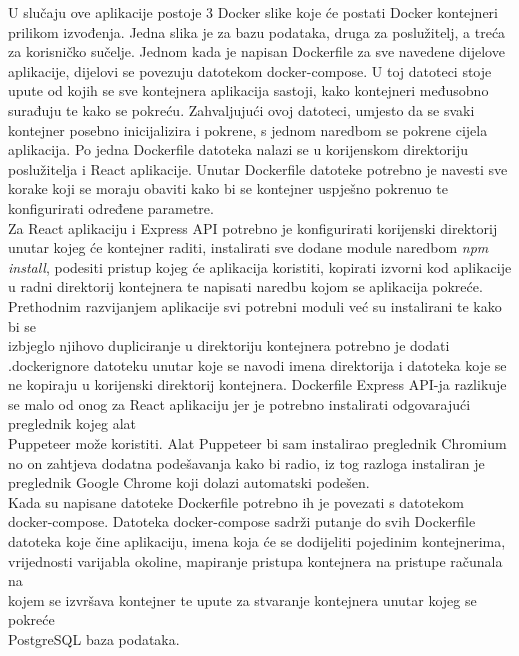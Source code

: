\documentclass[times, utf8, zavrsni]{fer}
\begin{document}
U slučaju ove aplikacije postoje 3 Docker slike koje će postati Docker kontejneri prilikom izvođenja. Jedna slika je za bazu podataka,
druga za poslužitelj, a treća za korisničko sučelje. Jednom kada je napisan Dockerfile za sve navedene dijelove aplikacije, dijelovi se povezuju  
datotekom docker-compose. U toj datoteci stoje upute od kojih se sve kontejnera aplikacija sastoji, kako kontejneri međusobno surađuju te kako se pokreću. Zahvaljujući 
ovoj datoteci, umjesto da se svaki kontejner posebno inicijalizira i pokrene, s jednom naredbom se pokrene cijela aplikacija.
Po jedna Dockerfile datoteka nalazi se u korijenskom direktoriju poslužitelja i 
React aplikacije. Unutar Dockerfile datoteke potrebno je navesti sve korake koji se moraju obaviti kako bi se kontejner uspješno pokrenuo te konfigurirati
određene parametre.
\\Za React aplikaciju i Express API potrebno je konfigurirati korijenski direktorij unutar kojeg će kontejner raditi, instalirati sve dodane module naredbom \emph{npm install}, 
podesiti pristup  kojeg će aplikacija koristiti, kopirati izvorni kod aplikacije u radni direktorij kontejnera te napisati naredbu kojom se 
aplikacija pokreće. \\Prethodnim razvijanjem aplikacije svi potrebni moduli već su instalirani te kako bi se\\izbjeglo njihovo dupliciranje u direktoriju kontejnera potrebno je dodati 
.dockerignore datoteku unutar koje se navodi imena direktorija i datoteka koje se ne kopiraju u korijenski direktorij kontejnera.
Dockerfile Express API-ja razlikuje se malo od onog za React aplikaciju jer je potrebno instalirati odgovarajući preglednik kojeg alat \\Puppeteer može koristiti.
Alat Puppeteer bi sam instalirao preglednik Chromium no on zahtjeva dodatna podešavanja kako bi radio, iz tog razloga instaliran je preglednik Google Chrome koji 
dolazi automatski podešen.
\\Kada su napisane datoteke Dockerfile potrebno ih je povezati s datotekom \\docker-compose. Datoteka docker-compose sadrži putanje do svih Dockerfile datoteka koje 
čine aplikaciju, imena koja će se dodijeliti pojedinim kontejnerima, \\vrijednosti varijabla okoline, mapiranje pristupa kontejnera na pristupe računala na \\kojem se izvršava kontejner te
upute za stvaranje kontejnera unutar kojeg se pokreće \\PostgreSQL baza podataka.
\end{document}
